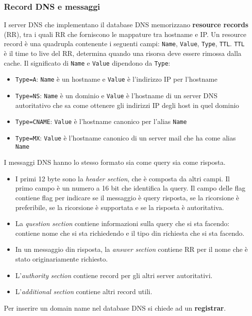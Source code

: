 \documentclass[11pt]{article}
\begin{document}
\subsubsection{Record DNS e messaggi}
I server DNS che implementano il database DNS memorizzano \textbf{resource records} (RR), tra i quali RR che forniscono
le mappature tra hostname e IP. Un resource record è una quadrupla contenente i seguenti campi: \texttt{Name}, 
\texttt{Value}, \texttt{Type}, \texttt{TTL}. \texttt{TTL} è il time to live del RR, determina quando una risorsa deve 
essere rimossa dalla cache. Il significato di \texttt{Name} e \texttt{Value} dipendono da \texttt{Type}:
\begin{itemize}
    \item \texttt{Type=A}: \texttt{Name} è un hostname e \texttt{Value} è l'indirizzo IP per l'hostname
    \item \texttt{Type=NS}: \texttt{Name} è un dominio e \texttt{Value} è l'hostname di un server DNS autoritativo che sa
    come ottenere gli indirizzi IP degli host in quel dominio
    \item \texttt{Type=CNAME}: \texttt{Value} è l'hostname canonico per l'alias \texttt{Name}
    \item \texttt{Type=MX}: \texttt{Value} è l'hostname canonico di un server mail che ha come alias \texttt{Name}
\end{itemize}
I messaggi DNS hanno lo stesso formato sia come query sia come risposta.
\begin{itemize}
    \item I primi 12 byte sono la \textit{header section}, che è composta da altri campi. Il primo campo è un numero a 
    16 bit che identifica la query. Il campo delle flag contiene flag per indicare se il messaggio è query risposta, se 
    la ricorsione è preferibile, se la ricorsione è supportata e se la risposta è autoritativa.
    \item La \textit{question section} contiene informazioni sulla query che si sta facendo: contiene nome che si sta
    richiedendo e il tipo din richiesta che si sta facendo.
    \item In un messaggio din risposta, la \textit{answer section} contiene RR per il nome che è stato originariamente
    richiesto.
    \item L'\textit{authority section} contiene record per gli altri server autoritativi.
    \item L'\textit{additional section} contiene altri record utili.
\end{itemize}
Per inserire un domain name nel database DNS si chiede ad un \textbf{registrar}.
\end{document}
